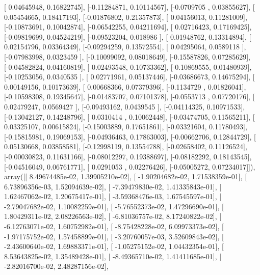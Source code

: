 \documentclass{article}
\begin{document}
       [ 0.04645948,  0.16822745],
       [-0.11284871,  0.10114567],
       [-0.0709705 ,  0.03855627],
       [ 0.05454665,  0.18417193],
       [-0.01876802,  0.21357873],
       [ 0.04156013,  0.11281009],
       [-0.10873691,  0.10042874],
       [-0.06542255,  0.04211694],
       [ 0.02716423,  0.17169425],
       [-0.09819699,  0.04524219],
       [-0.09523204,  0.018986  ],
       [ 0.01948762,  0.13314894],
       [ 0.02154796,  0.03364349],
       [-0.09294259,  0.13572554],
       [ 0.04295064,  0.0589118 ],
       [-0.07983998,  0.0323459 ],
       [-0.10099092,  0.08018649],
       [-0.15587826,  0.07285629],
       [-0.04582824,  0.04160819],
       [ 0.02493548,  0.10733362],
       [-0.10869555,  0.01480939],
       [-0.10253056,  0.0340535 ],
       [ 0.02771961,  0.05137446],
       [-0.03686673,  0.14675294],
       [ 0.00149156,  0.10173639],
       [ 0.00668366,  0.07379396],
       [-0.1134729 ,  0.01826041],
       [-0.10598308,  0.19345647],
       [-0.01483707,  0.07101378],
       [-0.0553713 ,  0.07720176],
       [ 0.02479247,  0.0569427 ],
       [-0.09493162,  0.0439545 ],
       [-0.04114325,  0.10971533],
       [-0.13042127,  0.14248796],
       [ 0.0310414 ,  0.10062448],
       [-0.03474705,  0.11565211],
       [ 0.03325107,  0.00615824],
       [-0.15003889,  0.17651861],
       [-0.03321604,  0.11780493],
       [-0.15815981,  0.19069153],
       [-0.04936463,  0.17863003],
       [-0.00662706,  0.12844729],
       [ 0.05130668,  0.03858581],
       [-0.12998119,  0.13554788],
       [-0.02658402,  0.11126524],
       [-0.00030823,  0.11631166],
       [-0.08012297,  0.19388697],
       [-0.08182292,  0.18143545],
       [-0.04516049,  0.06761771],
       [ 0.0291053 ,  0.02276426],
       [-0.05005272,  0.07234017]]), array([[  8.49674485e-02,   1.39905210e-02],
       [ -1.90204682e-02,   1.71538359e-01],
       [  6.73896356e-03,   1.52094639e-02],
       [ -7.39479830e-02,   1.41335843e-01],
       [  1.62467062e-02,   1.20675417e-01],
       [ -3.59368476e-03,   1.67545597e-01],
       [ -2.79047682e-02,   1.10082259e-01],
       [ -5.76552373e-02,   1.47296690e-01],
       [  1.80429311e-02,   2.08226563e-02],
       [ -6.81036757e-02,   8.17240822e-02],
       [ -6.12763071e-02,   1.60752982e-01],
       [ -8.75428228e-02,   6.09973373e-02],
       [ -1.97175752e-02,   1.57458899e-01],
       [ -3.20760057e-03,   3.52609843e-02],
       [ -2.43600640e-02,   1.69883371e-01],
       [ -1.05275152e-02,   1.04432354e-01],
       [  8.53643825e-02,   1.35489428e-01],
       [ -8.49365710e-02,   1.41411685e-01],
       [ -2.82016700e-02,   2.48287156e-02],
\end{document}
